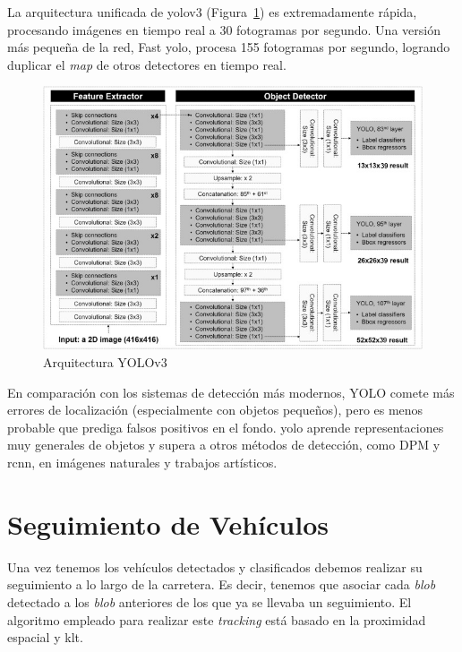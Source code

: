 La arquitectura unificada de \acrshort{yolo}v3 (Figura~\ref{fig.yolov3}) es extremadamente rápida, procesando imágenes en tiempo real a 30 fotogramas por segundo. Una versión más pequeña de la red, Fast \acrshort{yolo}, procesa 155 fotogramas por segundo, logrando duplicar el \textit{\acrfull{map}} de otros detectores en tiempo real.

\begin{figure}[H] 
\begin{center}
	\includegraphics[scale=0.7]{figures/Diseno_global/yolov3.png}
   \caption{Arquitectura YOLOv3}
	\label{fig.yolov3}
\end{center}
\end{figure}

En comparación con los sistemas de detección más modernos, YOLO comete más errores de localización (especialmente con objetos pequeños), pero es menos probable que prediga falsos positivos en el fondo. \acrshort{yolo} aprende representaciones muy generales de objetos y supera a otros métodos de detección, como DPM y \acrshort{rcnn}, en imágenes naturales y trabajos artísticos.


\section{Seguimiento de Vehículos}\label{sec.seguimiento}

Una vez tenemos los vehículos detectados y clasificados debemos realizar su seguimiento a lo largo de la carretera. Es decir, tenemos que asociar cada \textit{blob} detectado a los \textit{blob} anteriores de los que ya se llevaba un seguimiento. El algoritmo empleado para realizar este \textit{tracking} está basado en la proximidad espacial y \acrshort{klt}. 

